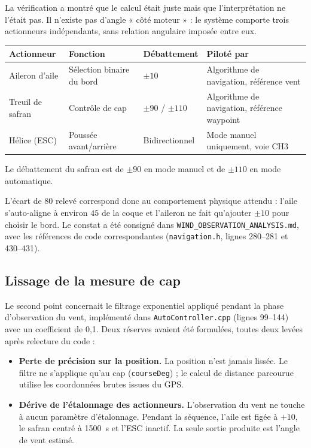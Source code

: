 \documentclass[11pt,a4paper]{article}
\newcommand{\code}[1]{\texttt{#1}}
\begin{document}
La vérification a montré que le calcul était juste mais que l'interprétation
ne l'était pas. Il n'existe pas d'angle « côté moteur » : le système comporte
trois actionneurs indépendants, sans relation angulaire imposée entre eux.

\vspace{0.3em}
{\footnotesize
\begin{tabularx}{\textwidth}{@{}l l l X@{}}
\toprule
\textbf{Actionneur} & \textbf{Fonction} & \textbf{Débattement} & \textbf{Piloté par} \\
\midrule
Aileron d'aile & Sélection binaire du bord & $\pm10$\textdegree{} & Algorithme de navigation, référence vent \\
Treuil de safran & Contrôle de cap & $\pm90$\textdegree{} / $\pm110$\textdegree{} & Algorithme de navigation, référence waypoint \\
Hélice (ESC) & Poussée avant/arrière & Bidirectionnel & Mode manuel uniquement, voie CH3 \\
\bottomrule
\end{tabularx}
}
\vspace{0.3em}

Le débattement du safran est de $\pm90$\textdegree{} en mode manuel et de $\pm110$\textdegree{} en mode
automatique.

L'écart de $80$\textdegree{} relevé correspond donc au comportement physique attendu :
l'aile s'auto-aligne à environ $45$\textdegree{} de la coque et l'aileron ne fait qu'ajouter
$\pm10$\textdegree{} pour choisir le bord. Le constat a été consigné dans
\code{WIND\_OBSERVATION\_ANALYSIS.md}, avec les références de code correspondantes
(\code{navigation.h}, lignes 280--281 et 430--431).

\subsection{Lissage de la mesure de cap}

Le second point concernait le filtrage exponentiel appliqué pendant la phase
d'observation du vent, implémenté dans \code{AutoController.cpp} (lignes 99--144)
avec un coefficient de 0,1. Deux réserves avaient été formulées, toutes deux
levées après relecture du code :

\begin{itemize}[leftmargin=1.2em,itemsep=0.35em]
\item \textbf{Perte de précision sur la position.} La position n'est jamais lissée. Le
filtre ne s'applique qu'au cap (\code{courseDeg}) ; le calcul de distance
parcourue utilise les coordonnées brutes issues du GPS.
\item \textbf{Dérive de l'étalonnage des actionneurs.} L'observation du vent ne touche
à aucun paramètre d'étalonnage. Pendant la séquence, l'aile est figée à $+10$\textdegree{},
le safran centré à 1500~\textmu s et l'ESC inactif. La seule sortie produite est
l'angle de vent estimé.
\end{itemize}
\end{document}
